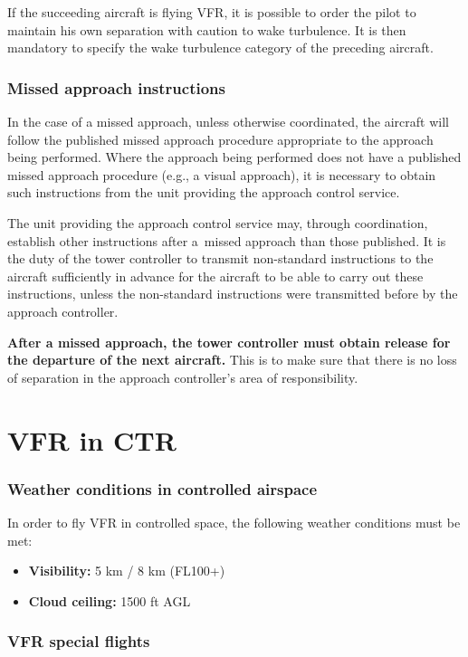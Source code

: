 If the succeeding aircraft is flying VFR, it is possible to order the pilot to maintain his own separation with caution to wake turbulence. It is then mandatory to specify the wake turbulence category of the preceding aircraft.

\subsubsection{Missed approach instructions}

In the case of a missed approach, unless otherwise coordinated, the aircraft will follow the published missed approach procedure appropriate to the approach being performed. Where the approach being performed does not have a published missed approach procedure (e.g., a visual approach), it is necessary to obtain such instructions from the unit providing the approach control service.

The unit providing the approach control service may, through coordination, establish other instructions after a~missed approach than those published. It is the duty of the tower controller to transmit non-standard instructions to the aircraft sufficiently in advance for the aircraft to be able to carry out these instructions, unless the non-standard instructions were transmitted before by the approach controller.

\textbf{After a missed approach, the tower controller must obtain release for the departure of the next aircraft.} This is to make sure that there is no loss of separation in the approach controller's area of responsibility.

\section{VFR in CTR}
\subsubsection{Weather conditions in controlled airspace}
In order to fly VFR in controlled space, the following weather conditions must be met:
\begin{itemize}
	\item \textbf{Visibility:} 5 km / 8 km (FL100+)
	\item \textbf{Cloud ceiling:} 1500 ft AGL
\end{itemize}

\subsubsection{VFR special flights}

